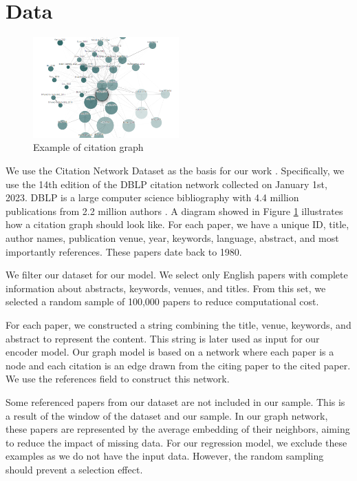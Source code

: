 \documentclass[10pt,twocolumn,letterpaper]{article}
\begin{document}
\section{Data}
\begin{figure}
   \centering
   \includegraphics[width=0.5\textwidth]{figures/cit_graph.png}
   \caption{Example of citation graph}
   \label{fig:cite_graph}
\end{figure}

We use the Citation Network Dataset as the basis for our work \cite{tang2008arnetminer}. Specifically, we use the 14th edition of the DBLP citation network collected on January 1st, 2023. DBLP is a large computer science bibliography with 4.4 million publications from 2.2 million authors \cite{ley2002dblp}. A diagram showed in Figure \ref{fig:cite_graph} illustrates how a citation graph should look like. 
For each paper, we have a unique ID, title, author names, publication venue, year, keywords, language, abstract, and most importantly references. These papers date back to 1980.

\begin{table}
   
\end{table}

We filter our dataset for our model. We select only English papers with complete information about abstracts, keywords, venues, and titles. From this set, we selected a random sample of 100,000 papers to reduce computational cost.

For each paper, we constructed a string combining the title, venue, keywords, and abstract to represent the content. This string is later used as input for our encoder model. Our graph model is based on a network where each paper is a node and each citation is an edge drawn from the citing paper to the cited paper. We use the references field to construct this network. 

Some referenced papers from our dataset are not included in our sample. This is a result of the window of the dataset and our sample.
In our graph network, these papers are represented by the average embedding of their neighbors, aiming to reduce the impact of missing data. 
For our regression model, we exclude these examples as we do not have the input data.
However, the random sampling should prevent a selection effect.
\end{document}
